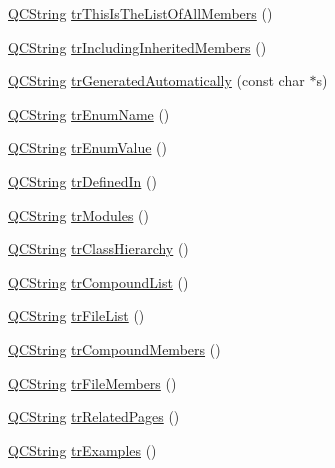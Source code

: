 \begin{DoxyCompactItemize}
\hyperlink{class_q_c_string}{Q\-C\-String} \hyperlink{class_translator_italian_aa4890a86c6f0232638bedf799b9cd600}{tr\-This\-Is\-The\-List\-Of\-All\-Members} ()
\item 
\hyperlink{class_q_c_string}{Q\-C\-String} \hyperlink{class_translator_italian_aac1033d8aaef30fde3dc36b7c207820d}{tr\-Including\-Inherited\-Members} ()
\item 
\hyperlink{class_q_c_string}{Q\-C\-String} \hyperlink{class_translator_italian_ae1830086931960c6fed36f1e7ea2e276}{tr\-Generated\-Automatically} (const char $\ast$s)
\item 
\hyperlink{class_q_c_string}{Q\-C\-String} \hyperlink{class_translator_italian_a7a6e29ca486072455bf3083ba8acfc18}{tr\-Enum\-Name} ()
\item 
\hyperlink{class_q_c_string}{Q\-C\-String} \hyperlink{class_translator_italian_a8504c48d2e7c98cdc58adb8c413bb583}{tr\-Enum\-Value} ()
\item 
\hyperlink{class_q_c_string}{Q\-C\-String} \hyperlink{class_translator_italian_a5808bd55db4b980bf98c20386a6f7766}{tr\-Defined\-In} ()
\item 
\hyperlink{class_q_c_string}{Q\-C\-String} \hyperlink{class_translator_italian_a7e7c4c8a0ebc34babcc72f2bf0b6a7e4}{tr\-Modules} ()
\item 
\hyperlink{class_q_c_string}{Q\-C\-String} \hyperlink{class_translator_italian_a2d2a657e41d15d96eef584d0b16ac838}{tr\-Class\-Hierarchy} ()
\item 
\hyperlink{class_q_c_string}{Q\-C\-String} \hyperlink{class_translator_italian_a89f7ed81df77d5e01296302aa818dced}{tr\-Compound\-List} ()
\item 
\hyperlink{class_q_c_string}{Q\-C\-String} \hyperlink{class_translator_italian_ad08ad4ba93076dfedb11dc43ca915a24}{tr\-File\-List} ()
\item 
\hyperlink{class_q_c_string}{Q\-C\-String} \hyperlink{class_translator_italian_acca37a92198919ac1908fd388ed78659}{tr\-Compound\-Members} ()
\item 
\hyperlink{class_q_c_string}{Q\-C\-String} \hyperlink{class_translator_italian_a2dc4f441708f3450ac98024452bac1d0}{tr\-File\-Members} ()
\item 
\hyperlink{class_q_c_string}{Q\-C\-String} \hyperlink{class_translator_italian_ac3e324016cdf6853802ffdf387a229a8}{tr\-Related\-Pages} ()
\item 
\hyperlink{class_q_c_string}{Q\-C\-String} \hyperlink{class_translator_italian_a49399a22bda9ddf0ad639669581002d4}{tr\-Examples} ()
\item 

\end{DoxyCompactItemize}
